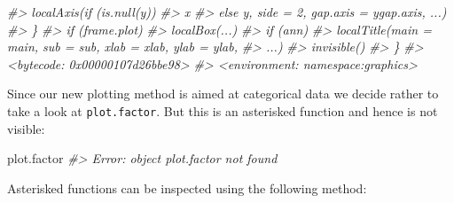 \documentclass[
]{book}
\newenvironment{Shaded}{\begin{snugshade}}{\end{snugshade}}
\newcommand{\CommentTok}[1]{\textcolor[rgb]{0.56,0.35,0.01}{\textit{#1}}}
\newcommand{\NormalTok}[1]{#1}
\begin{document}
\begin{Shaded}
\begin{Highlighting}[]
\CommentTok{\#\textgreater{}         localAxis(if (is.null(y)) }
\CommentTok{\#\textgreater{}             x}
\CommentTok{\#\textgreater{}         else y, side = 2, gap.axis = ygap.axis, ...)}
\CommentTok{\#\textgreater{}     \}}
\CommentTok{\#\textgreater{}     if (frame.plot) }
\CommentTok{\#\textgreater{}         localBox(...)}
\CommentTok{\#\textgreater{}     if (ann) }
\CommentTok{\#\textgreater{}         localTitle(main = main, sub = sub, xlab = xlab, ylab = ylab, }
\CommentTok{\#\textgreater{}             ...)}
\CommentTok{\#\textgreater{}     invisible()}
\CommentTok{\#\textgreater{} \}}
\CommentTok{\#\textgreater{} \textless{}bytecode: 0x00000107d26bbe98\textgreater{}}
\CommentTok{\#\textgreater{} \textless{}environment: namespace:graphics\textgreater{}}
\end{Highlighting}
\end{Shaded}

Since our new plotting method is aimed at categorical data we decide rather to take a look at \texttt{plot.factor}. But this is an asterisked function and hence is not visible:

\begin{Shaded}
\begin{Highlighting}[]
\NormalTok{plot.factor}
\CommentTok{\#\textgreater{} Error: object \textquotesingle{}plot.factor\textquotesingle{} not found}
\end{Highlighting}
\end{Shaded}

Asterisked functions can be inspected using the following method:
\end{document}
